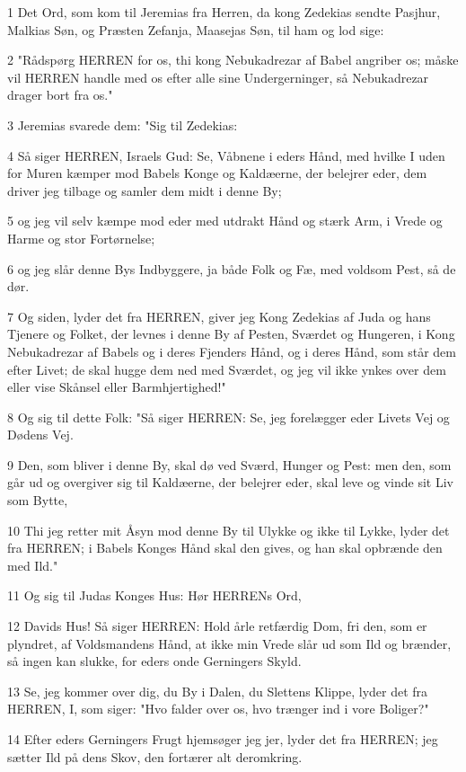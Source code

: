 \par 1 Det Ord, som kom til Jeremias fra Herren, da kong Zedekias sendte Pasjhur, Malkias Søn, og Præsten Zefanja, Maasejas Søn, til ham og lod sige:
\par 2 "Rådspørg HERREN for os, thi kong Nebukadrezar af Babel angriber os; måske vil HERREN handle med os efter alle sine Undergerninger, så Nebukadrezar drager bort fra os."
\par 3 Jeremias svarede dem: "Sig til Zedekias:
\par 4 Så siger HERREN, Israels Gud: Se, Våbnene i eders Hånd, med hvilke I uden for Muren kæmper mod Babels Konge og Kaldæerne, der belejrer eder, dem driver jeg tilbage og samler dem midt i denne By;
\par 5 og jeg vil selv kæmpe mod eder med utdrakt Hånd og stærk Arm, i Vrede og Harme og stor Fortørnelse;
\par 6 og jeg slår denne Bys Indbyggere, ja både Folk og Fæ, med voldsom Pest, så de dør.
\par 7 Og siden, lyder det fra HERREN, giver jeg Kong Zedekias af Juda og hans Tjenere og Folket, der levnes i denne By af Pesten, Sværdet og Hungeren, i Kong Nebukadrezar af Babels og i deres Fjenders Hånd, og i deres Hånd, som står dem efter Livet; de skal hugge dem ned med Sværdet, og jeg vil ikke ynkes over dem eller vise Skånsel eller Barmhjertighed!"
\par 8 Og sig til dette Folk: "Så siger HERREN: Se, jeg forelægger eder Livets Vej og Dødens Vej.
\par 9 Den, som bliver i denne By, skal dø ved Sværd, Hunger og Pest: men den, som går ud og overgiver sig til Kaldæerne, der belejrer eder, skal leve og vinde sit Liv som Bytte,
\par 10 Thi jeg retter mit Åsyn mod denne By til Ulykke og ikke til Lykke, lyder det fra HERREN; i Babels Konges Hånd skal den gives, og han skal opbrænde den med Ild."
\par 11 Og sig til Judas Konges Hus: Hør HERRENs Ord,
\par 12 Davids Hus! Så siger HERREN: Hold årle retfærdig Dom, fri den, som er plyndret, af Voldsmandens Hånd, at ikke min Vrede slår ud som Ild og brænder, så ingen kan slukke, for eders onde Gerningers Skyld.
\par 13 Se, jeg kommer over dig, du By i Dalen, du Slettens Klippe, lyder det fra HERREN, I, som siger: "Hvo falder over os, hvo trænger ind i vore Boliger?"
\par 14 Efter eders Gerningers Frugt hjemsøger jeg jer, lyder det fra HERREN; jeg sætter Ild på dens Skov, den fortærer alt deromkring.

